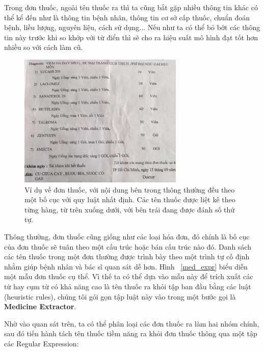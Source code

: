 Trong đơn thuốc, ngoài tên thuốc ra thì ta cũng bắt gặp nhiều thông tin khác có thể kể đến như là thông tin bệnh nhân, thông tin cơ sở cấp thuốc, chuẩn đoán bệnh, liều lượng, nguyên liệu, cách sử dụng... Nếu như ta có thể bỏ bớt các thông tin này trước khi so khớp với từ điển thì sẽ cho ra hiệu suất mô hình đạt tốt hơn nhiều so với cách làm cũ.

\begin{figure}
\centering
\includegraphics[width=0.7\textwidth]{mep_img/med_extr.png}
\caption{Ví dụ về đơn thuốc, với nội dung bên trong thông thường đều theo một bố cục với quy luật nhất định. Các tên thuốc được liệt kê theo từng hàng, từ trên xuống dưới, với bên trái đang được đánh số thứ tự.}\label{med_extr}
\end{figure}

Thông thường, đơn thuốc cũng giống như các loại hóa đơn, đó chính là bố cục của đơn thuốc sẽ tuân theo một cấu trúc hoặc bán cấu trúc nào đó. Danh sách các tên thuốc trong một đơn thường được trình bày theo một trình tự cố định nhằm giúp bệnh nhân và bác sĩ quan sát dễ hơn. Hình ~\ref{med_expr} biểu diễn một mẫu đơn thuốc cụ thể. Vì thế ta có thể dựa vào mẫu này để trích xuất các từ hay cụm từ có khả năng cao là tên thuốc ra khỏi tập ban đầu bằng các luật (heuristic rules), chúng tôi gói gọn tập luật này vào trong một bước gọi là \textbf{Medicine Extractor}.

Nhờ vào quan sát trên, ta có thể phân loại các đơn thuốc ra làm hai nhóm chính, sau đó tiến hành tách tên thuốc tiềm năng ra khỏi đơn thuốc thông qua một tập các Regular Expression:


